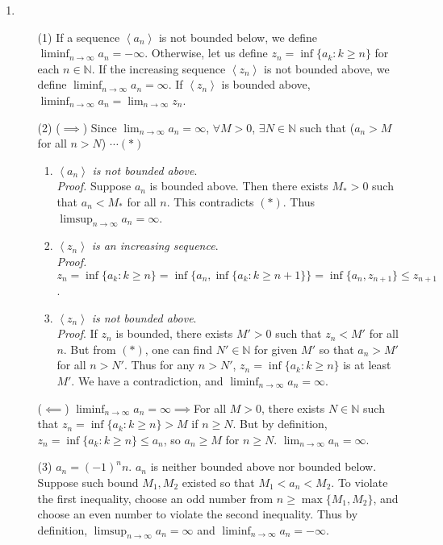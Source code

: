 \documentclass[12pt]{report}
\newcommand{\numl}[1]{\item[\large\textbf{\sffamily #1.}]}
\newcommand{\bb}[1]{\mathbb{#1}}
\renewcommand{\span}[1]{\left\langle #1 \right\rangle}
\newcommand{\ra}{\rightarrow}
\newcommand{\ds}{\displaystyle}
\begin{document}
\begin{enumerate}
\numl{3}
\begin{enumerate}
	\item[(1)] If a sequence $\span{a_n}$ is not bounded below, we define $\ds \liminf_{n\rightarrow \infty} a_n = -\infty$. Otherwise, let us define $z_n = \inf\{a_k: k \geq n\}$ for each $n\in\bb{N}$. If the increasing sequence $\span{z_n}$ is not bounded above, we define $\ds \liminf_{n\rightarrow \infty} a_n = \infty$. If $\span{z_n}$ is bounded above, $\ds \liminf_{n\rightarrow \infty} a_n = \lim_{n\rightarrow \infty} z_n$.
	\item[(2)] ($\implies$) Since $\ds \lim_{n\rightarrow \infty}a_n \!=\! \infty$, $\forall M \!>\! 0$, $\exists N\in\bb{N}$ such that ($a_n > M$ for all $n > N$) $\cdots (*)$
	\begin{enumerate}
		\item $\span{a_n}$ \textit{is not bounded above}.\\
		\textit{Proof.} Suppose $a_n$ is bounded above. Then there exists $M_* > 0$ such that $a_n < M_*$ for all $n$. This contradicts $(*)$. Thus $\ds \limsup_{n\rightarrow \infty}a_n = \infty$.
		\item $\span{z_n}$ \textit{is an increasing sequence}.\\
		\textit{Proof.} $z_n \!= \inf\{a_k: k \geq n \}\! = \inf\{a_n, \inf\{a_k: k \geq n + 1 \} \}\! = \inf\{a_n, z_{n+1} \}\leq z_{n+1}$.
		\item $\span{z_n}$ \textit{is not bounded above}.\\
		\textit{Proof}. If $z_n$ is bounded, there exists $M' >0$ such that $z_n < M'$ for all $n$. But from $(*)$, one can find $N'\in \bb{N}$ for given $M'$ so that $a_n > M'$ for all $n > N'$. Thus for any $n>N'$, $z_n = \inf\{a_k: k \geq n \}$ is at least $M'$. We have a contradiction, and $\ds\liminf_{n\rightarrow \infty} a_n = \infty$.
	\end{enumerate}
	($\impliedby$) $\ds\liminf_{n\ra \infty}a_n = \infty \implies$For all $M>0$, there exists $N\in\bb{N}$ such that $z_n = \inf \{a_k: k\geq n \} > M$ if $n\geq N$. But by definition, $z_n = \inf\{a_k:k\geq n \} \leq a_n$, so $a_n\geq M$ for $n\geq N$. $\ds \lim_{n\ra \infty} a_n = \infty$.
	\item[(3)] $a_n = (-1)^nn$. $a_n$ is neither bounded above nor bounded below. Suppose such bound $M_1, M_2$ existed so that $M_1 < a_n < M_2$. To violate the first inequality, choose an odd number from $n \geq \max\{M_1, M_2 \}$, and choose an even number to violate the second inequality. Thus by definition, $\ds \limsup_{n\rightarrow \infty}a_n = \infty$ and $\ds \liminf_{n\rightarrow \infty}a_n = -\infty$.
\end{enumerate}


\end{enumerate}
\end{document}
